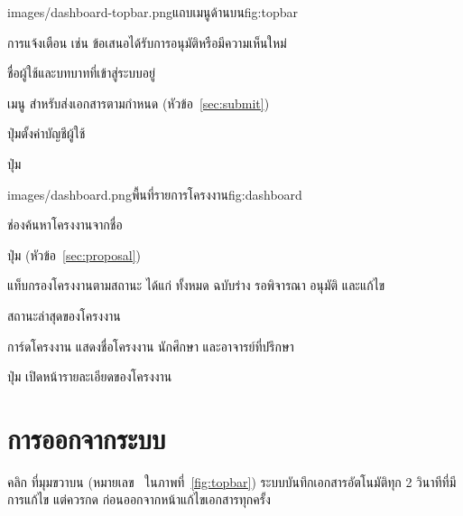 \begin{screenshot}[width=0.65\linewidth]{images/dashboard-topbar.png}{แถบเมนูด้านบน}{fig:topbar}
\end{screenshot}

\begin{calloutlist}
  \item การแจ้งเตือน เช่น ข้อเสนอได้รับการอนุมัติหรือมีความเห็นใหม่
  \item ชื่อผู้ใช้และบทบาทที่เข้าสู่ระบบอยู่
  \item เมนู  สำหรับส่งเอกสารตามกำหนด (หัวข้อ~\ref{sec:submit})
  \item ปุ่มตั้งค่าบัญชีผู้ใช้
  \item ปุ่ม 
\end{calloutlist}

\begin{screenshot}{images/dashboard.png}{พื้นที่รายการโครงงาน}{fig:dashboard}
\end{screenshot}

\begin{calloutlist}
  \item ช่องค้นหาโครงงานจากชื่อ
  \item ปุ่ม  (หัวข้อ~\ref{sec:proposal})
  \item แท็บกรองโครงงานตามสถานะ ได้แก่ ทั้งหมด ฉบับร่าง รอพิจารณา อนุมัติ และแก้ไข
  \item สถานะล่าสุดของโครงงาน
  \item การ์ดโครงงาน แสดงชื่อโครงงาน นักศึกษา และอาจารย์ที่ปรึกษา
  \item ปุ่ม  เปิดหน้ารายละเอียดของโครงงาน
\end{calloutlist}

\section{การออกจากระบบ}

คลิก  ที่มุมขวาบน (หมายเลข~ ในภาพที่~\ref{fig:topbar})
ระบบบันทึกเอกสารอัตโนมัติทุก 2 วินาทีที่มีการแก้ไข แต่ควรกด  ก่อนออกจากหน้าแก้ไขเอกสารทุกครั้ง
